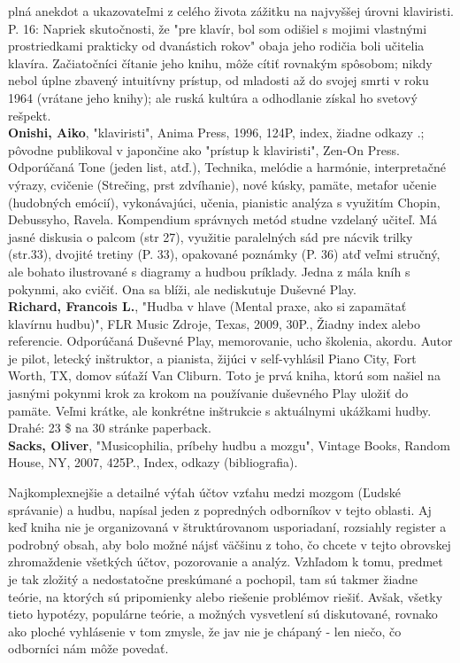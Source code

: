 \documentclass[11pt,a4paper%
]{article}
\begin{document}
plná anekdot a ukazovateľmi z celého života zážitku na najvyššej úrovni klaviristi. P. 16:
Napriek skutočnosti, že "pre klavír, bol som odišiel s mojimi vlastnými prostriedkami prakticky od dvanástich rokov"
obaja jeho rodičia boli učitelia klavíra. Začiatočníci čítanie jeho knihu, môže cítiť rovnakým spôsobom; nikdy nebol
úplne zbavený intuitívny prístup, od mladosti až do svojej smrti v roku 1964 (vrátane jeho knihy);
ale ruská kultúra a odhodlanie získal ho svetový rešpekt.
\medskip\\
\textbf{Onishi, Aiko}, "klaviristi", Anima Press, 1996, 124P, index, žiadne odkazy .; pôvodne publikoval v japončine
ako "prístup k klaviristi", Zen-On Press. Odporúčaná
Tone (jeden list, atď.), Technika, melódie a harmónie, interpretačné výrazy, cvičenie
(Strečing, prst zdvíhanie), nové kúsky, pamäte, metafor učenie (hudobných emócií), vykonávajúci,
učenia, pianistic analýza s využitím Chopin, Debussyho, Ravela. Kompendium správnych metód studne
vzdelaný učiteľ.
Má jasné diskusia o palcom (str 27), využitie paralelných sád pre nácvik trilky (str.33), dvojité
tretiny (P. 33), opakované poznámky (P. 36) atď veľmi stručný, ale bohato ilustrované s diagramy a hudbou
príklady. Jedna z mála kníh s pokynmi, ako cvičiť. Ona sa blíži, ale nediskutuje
Duševné Play.
\medskip\\
\textbf{Richard, Francois L.}, "Hudba v hlave (Mental praxe, ako si zapamätať klavírnu hudbu)", FLR Music
Zdroje, Texas, 2009, 30P., Žiadny index alebo referencie. Odporúčaná
Duševné Play, memorovanie, ucho školenia, akordu. Autor je pilot, letecký inštruktor, a
pianista, žijúci v self-vyhlásil Piano City, Fort Worth, TX, domov súťaží Van Cliburn.
Toto je prvá kniha, ktorú som našiel na jasnými pokynmi krok za krokom na používanie duševného Play uložiť do pamäte.
Veľmi krátke, ale konkrétne inštrukcie s aktuálnymi ukážkami hudby. Drahé: 23 \$ na 30 stránke
paperback.
\medskip\\
\textbf{Sacks, Oliver}, "Musicophilia, príbehy hudbu a mozgu", Vintage Books, Random House, NY, 2007, 425P., Index, odkazy (bibliografia).

Najkomplexnejšie a detailné výťah účtov vzťahu medzi mozgom (Ľudské správanie) a hudbu, napísal jeden z popredných odborníkov v tejto oblasti. Aj keď kniha nie je organizovaná v štruktúrovanom usporiadaní, rozsiahly register a podrobný obsah, aby bolo možné nájsť väčšinu z toho, čo chcete v tejto obrovskej zhromaždenie všetkých účtov, pozorovanie a analýz. Vzhľadom k tomu, predmet je tak zložitý a nedostatočne preskúmané a pochopil, tam sú takmer žiadne teórie, na ktorých sú pripomienky alebo riešenie problémov riešiť. Avšak, všetky tieto hypotézy, populárne teórie, a možných vysvetlení sú diskutované, rovnako ako ploché vyhlásenie v tom zmysle, že jav nie je chápaný - len niečo, čo odborníci nám môže povedať.
\end{document}
